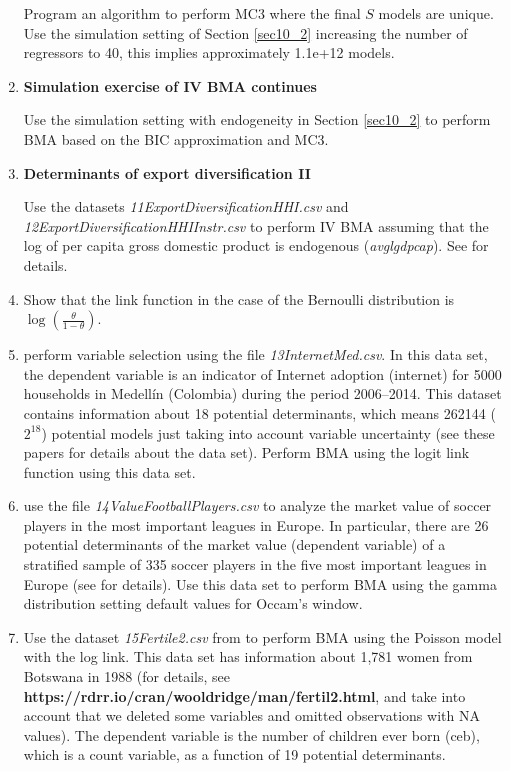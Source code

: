 \begin{enumerate}
Program an algorithm to perform MC3 where the final $S$ models are unique. Use the simulation setting of Section \ref{sec10_2} increasing the number of regressors to 40, this implies approximately 1.1e+12 models.

\item \textbf{Simulation exercise of IV BMA continues}

Use the simulation setting with endogeneity in Section \ref{sec10_2} to perform BMA based on the BIC approximation and MC3.

\item \textbf{Determinants of export diversification II}

Use the datasets \textit{11ExportDiversificationHHI.csv} and \textit{12ExportDiversificationHHIInstr.csv} to perform IV BMA assuming that the log of per capita gross domestic product is endogenous (\textit{avglgdpcap}). See \cite{Jetter2015} for details.

\item Show that the link function in the case of the Bernoulli distribution is $\log\left(\frac{\theta}{1-\theta}\right)$.

\item \cite{ramirez2020dynamic,ramirez2021specification} perform variable selection using the file \textit{13InternetMed.csv}. In this data set, the dependent variable is an indicator of Internet adoption (internet) for 5000 households in Medell\'in (Colombia) during the period 2006--2014. This dataset contains information about 18 potential determinants, which means 262144 ($2^{18}$) potential models just taking into account variable uncertainty (see these papers for details about the data set). Perform BMA using the logit link function using this data set.  

\item \cite{Serna2018} use the file \textit{14ValueFootballPlayers.csv} to analyze the market value of soccer players in the most important leagues in Europe. In particular, there are 26 potential determinants of the market value (dependent variable) of a stratified sample of 335 soccer players in the five most important leagues in Europe (see \cite{Serna2018} for details). Use this data set to perform BMA using the gamma distribution setting default values for Occam's window.  

\item Use the dataset \textit{15Fertile2.csv} from \cite[p.~547]{Wooldridge2012} to perform BMA using the Poisson model with the log link. This data set has information about 1,781 women from Botswana in 1988 (for details, see \textbf{https://rdrr.io/cran/wooldridge/man/fertil2.html}, and take into account that we deleted some variables and omitted observations with NA values). The dependent variable is the number of children ever born (ceb), which is a count variable, as a function of 19 potential determinants.


\end{enumerate}

